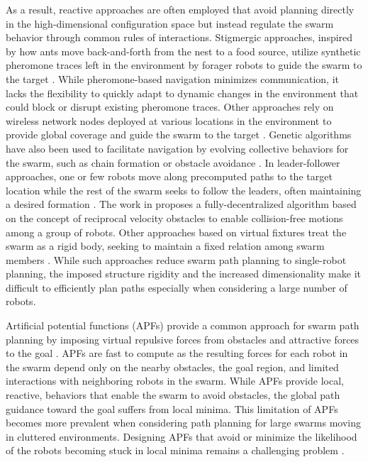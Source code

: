 \documentclass[letterpaper, 10pt, conference]{ieeeconf}
\begin{document}
As a result, reactive approaches are often employed that avoid
planning directly in the high-dimensional configuration space but
instead regulate the swarm behavior through common rules of
interactions. Stigmergic approaches, inspired by how ants move
back-and-forth from the nest to a food source, utilize synthetic
pheromone traces left in the environment by forager robots to guide
the swarm to the target
\cite{swarmPheromone1,swarmPheromone2,swarmPheromone3}.  While
pheromone-based navigation minimizes communication, it lacks the
flexibility to quickly adapt to dynamic changes in the environment
that could block or disrupt existing pheromone traces. Other
approaches rely on wireless network nodes deployed at various
locations in the environment to provide global coverage and guide the
swarm to the target \cite{swarmComm1,swarmComm2}.  Genetic algorithms
have also been used to facilitate navigation by evolving collective
behaviors for the swarm, such as chain formation or obstacle avoidance
\cite{swarmEvolve1,swarmEvolve2}.  In leader-follower approaches, one
or few robots move along precomputed paths to the target location
while the rest of the swarm seeks to follow the leaders, often
maintaining a desired formation
\cite{swarmLeader1,swarmLeader2,swarmLeader3}. The work in
\cite{JurVel} proposes a fully-decentralized algorithm based on
the concept of reciprocal velocity obstacles to enable collision-free
motions among a group of robots. Other approaches based
on virtual fixtures treat the swarm as a rigid body, seeking to
maintain a fixed relation among swarm members
\cite{swarmFixture1,swarmFixture2,swarmFixture3}. While such
approaches reduce swarm path planning to single-robot planning, the
imposed structure rigidity and the increased dimensionality make it
difficult to efficiently plan paths especially when considering a
large number of robots. 


Artificial potential functions (APFs) provide a common approach for
swarm path planning by imposing virtual repulsive forces from
obstacles and attractive forces to the goal
\cite{Khatib86,reif1999social,book:SwarmsAPFs,tanner2005formation,swarmPF1,swarmPF2}.
APFs are fast to compute as the resulting forces for each robot in the
swarm depend only on the nearby obstacles, the goal region, and
limited interactions with neighboring robots in the swarm.  While APFs
provide local, reactive, behaviors that enable the swarm to avoid
obstacles, the global path guidance toward the goal suffers from local
minima.  This limitation of APFs becomes more prevalent when
considering path planning for large swarms moving in cluttered
environments. Designing APFs that avoid or minimize the likelihood of
the robots becoming stuck in local minima remains a challenging problem
\cite{RK92}.
\end{document}
